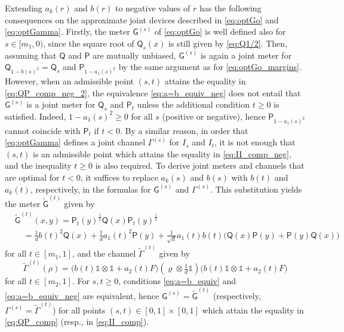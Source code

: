 \documentclass[12pt,reqno]{amsart}
\theoremstyle{definition}
\newcommand{\id}{\mathds{1}} %
\newcommand{\Qo}{\mathsf{Q}}%
\newcommand{\Po}{\mathsf{P}}%
\newcommand{\Go}{\mathsf{G}}%
\newcommand{\rhoo}{\varrho} %
\begin{document}
Extending $a_k(r)$ and $b(r)$ to negative values of $r$ has the following consequences on the approximate joint devices described in \eqref{eq:optGo} and \eqref{eq:optGamma}. Firstly, the meter $\Go^{(s)}$ of \eqref{eq:optGo} is well defined also for $s\in [m_1,0)$, since the square root of $\Qo_s(x)$ is still given by \eqref{eq:Q1/2}. Then, assuming that $\Qo$ and $\Po$ are mutually unbiased, $\Go^{(s)}$ is again a joint meter for $\Qo_{1-b(s)^2} = \Qo_s$ and $\Po_{1-a_1(s)^2}$ by the same argument as for \eqref{eq:optGo_margins}. However, when an admissible point $(s,t)$ attains the equality in \eqref{eq:QP_comp_neg_2}, the equivalence \eqref{eq:a=b_equiv_neg} does not entail that $\Go^{(s)}$ is a joint meter for $\Qo_s$ and $\Po_t$ unless the additional condition $t\geq 0$ is satisfied. Indeed, $1-a_1(s)^2\geq 0$ for all $s$ (positive or negative), hence $\Po_{1-a_1(s)^2}$ cannot coincide with $\Po_t$ if $t<0$. By a similar reason, in order that \eqref{eq:optGamma} defines a joint channel $\Gamma^{(s)}$ for $I_s$ and $I_t$, it is not enough that $(s,t)$ is an admissible point which attains the equality in \eqref{eq:II_comp_neg}, and the inequality $t\geq 0$ is also required. To derive joint meters and channels that are optimal for $t<0$, it suffices to replace $a_k(s)$ and $b(s)$ with $b(t)$ and $a_k(t)$, respectively, in the formulas for $\Go^{(s)}$ and $\Gamma^{(s)}$. This substitution yields the meter $\tilde{\Go}^{(t)}$ given by
\begin{equation}\label{eq:tildeGo}
\begin{aligned}
& \tilde{\Go}^{(t)}(x,y) = \Po_t(y)^{\frac{1}{2}}\Qo(x)\Po_t(y)^{\frac{1}{2}} \\
& \quad = \frac{1}{d} b(t)^2 \Qo(x) + \frac{1}{d} a_1(t)^2 \Po(y) + \frac{1}{\sqrt{d}} a_1(t) b(t) \big(\Qo(x)\Po(y) + \Po(y)\Qo(x)\big)
\end{aligned}
\end{equation}
for all $t\in [m_1,1]$, and the channel $\tilde{\Gamma}^{(t)}$ given by
\begin{equation}\label{eq:tildeGamma}
\tilde{\Gamma}^{(t)}(\rho) = \big(b(t)\id\otimes\id + a_2(t)F\big)\left(\rhoo\otimes\tfrac{1}{d}\id\right)\big(b(t)\id\otimes\id + a_2(t)F\big)
\end{equation}
for all $t\in [m_2,1]$. For $s,t\geq 0$, conditions \eqref{eq:a=b_equiv} and \eqref{eq:a=b_equiv_neg} are equivalent, hence $\Go^{(s)} = \tilde{\Go}^{(t)}$ (respectively, $\Gamma^{(s)} = \tilde{\Gamma}^{(t)}$) for all points $(s,t)\in [0,1]\times [0,1]$ which attain the equality in \eqref{eq:QP_comp} (resp., in \eqref{eq:II_comp}).
\end{document}
